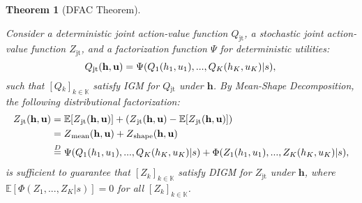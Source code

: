 \documentclass[twoside,11pt]{article}
\newcommand{\state}{s}
\newcommand{\jointaction}{\mathbf{u}}
\newcommand{\action}{u}
\newcommand{\jointobservationhistory}{\mathbf{h}}
\newcommand{\observationhistory}{h}
\newcommand{\agentspace}{\mathbb{K}}
\newcommand{\agentcounter}{k}
\newcommand{\numberofagents}{K}
\newcommand{\utilityexp}{Q}
\newcommand{\utility}{Z}
\newcommand{\joint}{\mathrm{jt}}
\newcommand{\meandecompositionfunction}{\Psi}
\newcommand{\shapedecompositionfunction}{\Phi}
\newcommand{\digm}{DIGM}
\newcommand{\eqd}{\overset{D}{=}}
\newcounter{theorem0}
\newtheorem{theorem}[theorem0]{Theorem}
\begin{document}
\begin{theorem}[DFAC Theorem]
\label{thm:dfac}

Consider a deterministic joint action-value function $\utilityexp_{\joint}$, a stochastic joint action-value function $\utility_{\joint}$, and a factorization function $\meandecompositionfunction$ for deterministic utilities:
\begin{equation}
\utilityexp{}_{\joint{}}(\jointobservationhistory{},{\jointaction{}})=\meandecompositionfunction(\utilityexp{}_1(\observationhistory{}_1,\action{}_1), ..., \utilityexp{}_{\numberofagents{}}(\observationhistory{}_{\numberofagents{}},\action{}_{\numberofagents{}})\vert\state),
\notag{}
\end{equation}
such that $[\utilityexp{}_\agentcounter{}]_{\agentcounter{}\in\agentspace{}}$ satisfy IGM for $\utilityexp{}_{\joint{}}$ under $\jointobservationhistory{}$. By Mean-Shape Decomposition, the following distributional factorization:
\begin{equation}
\begin{split}
\utility{}_{\joint{}}(\jointobservationhistory{},{\jointaction{}}) &= \mathbb{E}[\utility{}_{\joint{}}(\jointobservationhistory{},{\jointaction{}})]+(\utility{}_{\joint{}}(\jointobservationhistory{},{\jointaction{}})-\mathbb{E}[\utility{}_{\joint{}}(\jointobservationhistory{},{\jointaction{}})]) \\
&= \utility{}_{\mathrm{mean}}(\jointobservationhistory{},{\jointaction{}})+\utility{}_{\mathrm{shape}}(\jointobservationhistory{},{\jointaction{}})\\
&\eqd \meandecompositionfunction{}(\utilityexp_1(\observationhistory{}_1,\action{}_1),...,\utilityexp_{\numberofagents{}}(\observationhistory{}_{\numberofagents{}},\action{}_{\numberofagents{}})\vert\state) + \shapedecompositionfunction{}(\utility_1(\observationhistory{}_1,\action{}_1),...,\utility_{\numberofagents{}}(\observationhistory{}_{\numberofagents{}},\action{}_{\numberofagents{}})\vert\state),
\end{split}
\notag{}
\end{equation}
is sufficient to guarantee that $[\utility{}_\agentcounter{}]_{\agentcounter{}\in\agentspace{}}$ satisfy \digm{} for $\utility{}_{\joint{}}$ under $\jointobservationhistory{}$, where $\mathbb{E}[\shapedecompositionfunction{}(\utility_1,...,\utility_{\numberofagents{}}\vert\state)]=0$ for all $[\utility{}_\agentcounter{}]_{\agentcounter{}\in\agentspace{}}$.
\end{theorem}
\end{document}
